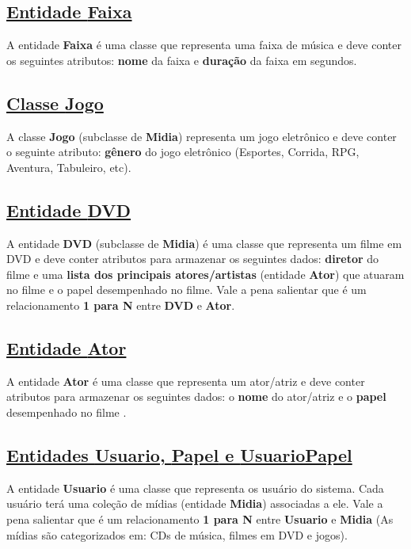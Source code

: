 \subsection*{\underline{Entidade {\bf Faixa}}}

A entidade {\bf  Faixa} é uma classe  que representa uma faixa de  música e deve
conter os seguintes  atributos: {\bf nome} da faixa e {\bf  duração} da faixa em
segundos.

\subsection*{\underline{Classe {\bf Jogo}}}

A classe {\bf  Jogo} (subclasse de {\bf Midia}) representa  um jogo eletrônico e
deve  conter o  seguinte atributo:  {\bf gênero}  do jogo  eletrônico (Esportes,
Corrida, RPG, Aventura, Tabuleiro, etc).

\subsection*{\underline{Entidade {\bf DVD}}}

A entidade {\bf  DVD} (subclasse de {\bf Midia}) é uma  classe que representa um
filme em  DVD e deve  conter atributos para  armazenar os seguintes  dados: {\bf
  diretor} do filme  e uma {\bf lista dos  principais atores/artistas} (entidade
{\bf Ator}) que atuaram no filme e  o papel desempenhado no filme.  Vale a pena
salientar que é um relacionamento {\bf 1 para N} entre {\bf DVD} e {\bf Ator}.

\subsection*{\underline{Entidade {\bf Ator}}}

A entidade  {\bf Ator} é uma classe  que representa um ator/atriz  e deve conter
atributos para armazenar os seguintes dados: o {\bf nome} do ator/atriz e o {\bf
  papel} desempenhado no filme .  

\subsection*{\underline{Entidades {\bf Usuario}, {\bf Papel} e {\bf UsuarioPapel}}}

A entidade {\bf Usuario} é uma classe que representa os usuário do sistema. Cada
usuário terá uma coleção de mídias (entidade {\bf Midia}) associadas a ele. Vale
a pena salientar  que é um relacionamento  {\bf 1 para N} entre  {\bf Usuario} e
{\bf Midia}  (As mídias  são categorizados em:  CDs de  música, filmes em  DVD e
jogos). 

